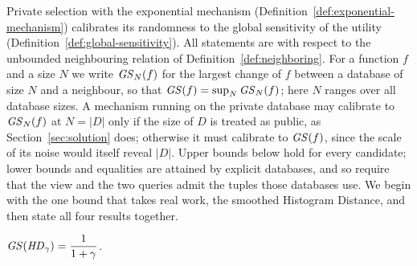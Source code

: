 Private selection with the exponential mechanism (Definition~\ref{def:exponential-mechanism}) calibrates its randomness to the global sensitivity of the utility (Definition~\ref{def:global-sensitivity}).
All statements are with respect to the unbounded neighbouring relation of Definition~\ref{def:neighboring}.
For a function $f$ and a size $N$ we write $\mathit{GS}_N(f)$ for the largest change of $f$ between a database of size $N$ and a neighbour, so that $\mathit{GS}(f)=\sup_N\mathit{GS}_N(f)$; here $N$ ranges over all database sizes.
A mechanism running on the private database may calibrate to $\mathit{GS}_N(f)$ at $N=|D|$ only if the size of $D$ is treated as public, as Section~\ref{sec:solution} does; otherwise it must calibrate to $\mathit{GS}(f)$, since the scale of its noise would itself reveal $|D|$.
Upper bounds below hold for every candidate; lower bounds and equalities are attained by explicit databases, and so require that the view and the two queries admit the tuples those databases use.
We begin with the one bound that takes real work, the smoothed Histogram Distance, and then state all four results together.

\begin{proposition}
\label{prop:hd-sensitivity}
$\mathit{GS}(\mathit{HD}_\gamma)=\dfrac{1}{1+\gamma}$.
\end{proposition}

